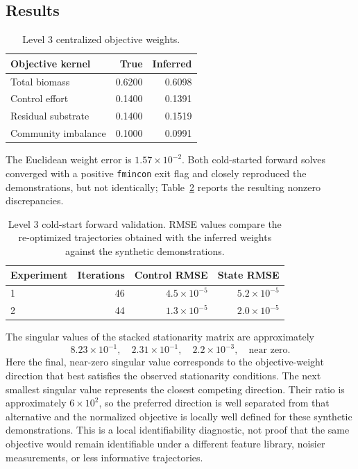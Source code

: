 \documentclass[11pt,a4paper]{article}
\begin{document}
\subsection{Results}

\begin{table}[H]
\centering
\caption{Level 3 centralized objective weights.}
\label{tab:level3}
\begin{tabular}{lrr}
\toprule
Objective kernel & True & Inferred\\
\midrule
Total biomass & 0.6200 & 0.6098\\
Control effort & 0.1400 & 0.1391\\
Residual substrate & 0.1400 & 0.1519\\
Community imbalance & 0.1000 & 0.0991\\
\bottomrule
\end{tabular}
\end{table}

The Euclidean weight error is \(1.57\times10^{-2}\). Both cold-started forward
solves converged with a positive \texttt{fmincon} exit flag and closely
reproduced the demonstrations, but not identically; Table~\ref{tab:level3-validation}
reports the resulting nonzero discrepancies.

\begin{table}[H]
\centering
\caption{Level 3 cold-start forward validation. RMSE values compare the
re-optimized trajectories obtained with the inferred weights against the
synthetic demonstrations.}
\label{tab:level3-validation}
\begin{tabular}{lrrr}
\toprule
Experiment & Iterations & Control RMSE & State RMSE\\
\midrule
1 & 46 & \(4.5\times10^{-5}\) & \(5.2\times10^{-5}\)\\
2 & 44 & \(1.3\times10^{-5}\) & \(2.0\times10^{-5}\)\\
\bottomrule
\end{tabular}
\end{table}

The singular values of the stacked stationarity matrix are approximately
\[
  8.23\times10^{-1},\quad
  2.31\times10^{-1},\quad
  2.2\times10^{-3},\quad
  \text{near zero}.
\]
Here the final, near-zero singular value corresponds to the objective-weight
direction that best satisfies the observed stationarity conditions. The next
smallest singular value represents the closest competing direction. Their ratio
is approximately \(6\times10^2\), so the preferred direction is well separated
from that alternative and the normalized objective is locally well defined for
these synthetic demonstrations. This is a local identifiability diagnostic, not
proof that the same objective would remain identifiable under a different
feature library, noisier measurements, or less informative trajectories.
\end{document}
